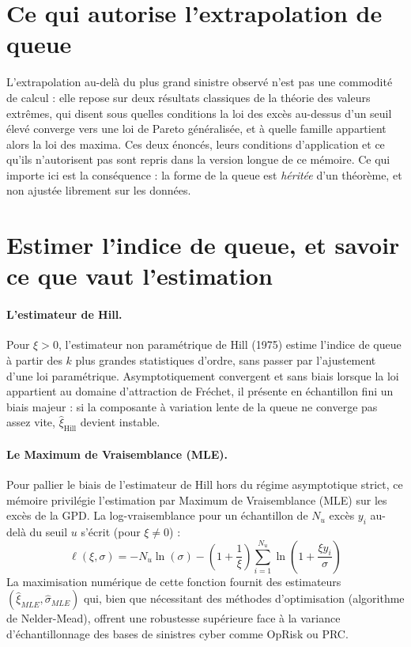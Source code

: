 \section{Ce qui autorise l'extrapolation de queue}
L'extrapolation au-delà du plus grand sinistre observé n'est pas une commodité de
calcul : elle repose sur deux résultats classiques de la théorie des valeurs extrêmes,
qui disent sous quelles conditions la loi des excès au-dessus d'un seuil élevé converge
vers une loi de Pareto généralisée, et à quelle famille appartient alors la loi des
maxima. Ces deux énoncés, leurs conditions d'application et ce qu'ils n'autorisent pas
sont repris dans la version longue de ce mémoire. Ce qui importe ici est la conséquence : la forme
de la queue est \emph{héritée} d'un théorème, et non ajustée librement sur les données.

\section{Estimer l'indice de queue, et savoir ce que vaut l'estimation}


\paragraph{L'estimateur de Hill.}
Pour $\xi > 0$, l'estimateur non paramétrique de Hill (1975) estime l'indice de queue à partir des $k$ plus grandes statistiques d'ordre, sans passer par l'ajustement d'une loi paramétrique. Asymptotiquement convergent et sans biais lorsque la loi appartient au domaine d'attraction de Fréchet, il présente en échantillon fini un biais majeur : si la composante à variation lente de la queue ne converge pas assez vite, $\hat{\xi}_{\text{Hill}}$ devient instable.

\paragraph{Le Maximum de Vraisemblance (MLE).}
Pour pallier le biais de l'estimateur de Hill hors du régime asymptotique strict, ce mémoire privilégie l'estimation par Maximum de Vraisemblance (MLE) sur les excès de la GPD. La log-vraisemblance pour un échantillon de $N_u$ excès $y_i$ au-delà du seuil $u$ s'écrit (pour $\xi \neq 0$) :
\begin{equation}
\ell(\xi, \sigma) = -N_u \ln(\sigma) - \left(1 + \frac{1}{\xi}\right) \sum_{i=1}^{N_u} \ln\left(1 + \frac{\xi y_i}{\sigma}\right)
\label{soc:eq:loglik-gpd}
\end{equation}
La maximisation numérique de cette fonction fournit des estimateurs $(\hat{\xi}_{MLE}, \hat{\sigma}_{MLE})$ qui, bien que nécessitant des méthodes d'optimisation (algorithme de Nelder-Mead), offrent une robustesse supérieure face à la variance d'échantillonnage des bases de sinistres cyber comme OpRisk ou PRC.

